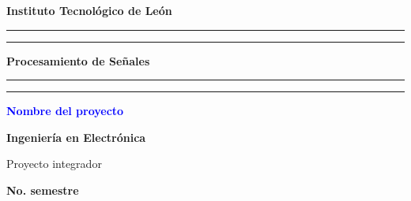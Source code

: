 \documentclass[12pt]{article}
\begin{document}
\begin{center}
\hspace{3cm}
\textbf{\Large Instituto Tecnológico de León}\\[1.5cm]
\vspace{-1.5cm}

\hspace{3cm}
\rule{100mm}{1mm}%

\vspace{-0.4cm}
\hspace{3cm}
\rule{100mm}{0.5mm}%

\vspace{1.5cm}
\hspace{3cm}	

\hspace{3cm}
\vspace{-1cm}
{\Large \bf Procesamiento de Señales}
\begin{flushleft}
\vspace{1 cm}
\hspace{1 cm}
\rule[1mm]{1mm}{14.5cm}%
\hspace{-1mm}
\rule[1mm]{0.5mm}{14.5cm}%
\end{flushleft}	
\vspace{-15.5cm}															\hspace{3cm}		%

\vspace{1cm}      \hspace{3cm}%
{ \large \bfseries \textcolor{blue}{Nombre del proyecto }}\\	%
\hspace{3cm} 
%
\vspace{1cm}

\hspace{3cm}
{\bf Ingeniería en Electrónica}
\end{center}

\begin{center}
\vspace{0.7cm}																\hspace{2.5cm}		%
\LARGE{Proyecto integrador}
\end{center}



\begin{center}																\hspace{2.5cm}					%
\large{\textbf{No. semestre}}
\end{center}
\end{document}
